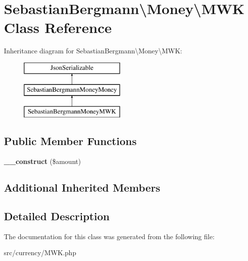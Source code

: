 \hypertarget{classSebastianBergmann_1_1Money_1_1MWK}{}\section{Sebastian\+Bergmann\textbackslash{}Money\textbackslash{}M\+W\+K Class Reference}
\label{classSebastianBergmann_1_1Money_1_1MWK}
Inheritance diagram for Sebastian\+Bergmann\textbackslash{}Money\textbackslash{}M\+W\+K\+:\begin{figure}[H]
\begin{center}
\leavevmode
\includegraphics[height=3.000000cm]{classSebastianBergmann_1_1Money_1_1MWK}
\end{center}
\end{figure}
\subsection*{Public Member Functions}
\begin{DoxyCompactItemize}
\item 
\hypertarget{classSebastianBergmann_1_1Money_1_1MWK_aa4637959cae6c1c954038a5f44ceb29f}{}{\bfseries \+\_\+\+\_\+construct} (\$amount)\label{classSebastianBergmann_1_1Money_1_1MWK_aa4637959cae6c1c954038a5f44ceb29f}

\end{DoxyCompactItemize}
\subsection*{Additional Inherited Members}


\subsection{Detailed Description}


The documentation for this class was generated from the following file\+:\begin{DoxyCompactItemize}
\item 
src/currency/M\+W\+K.\+php\end{DoxyCompactItemize}
